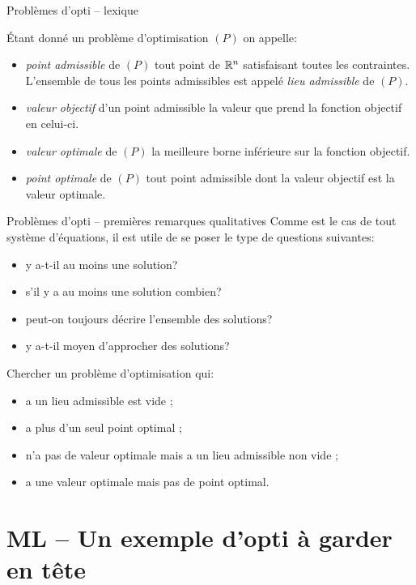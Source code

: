 \documentclass[aspectratio = 169]{beamer}
\begin{document}
\begin{frame}{Problèmes d'opti -- lexique}

  Étant donné un problème d'optimisation $(P)$ on appelle:
  \begin{itemize}
  \item<1-> \emph{point admissible} de $(P)$ tout point de $\mathbb{R}^n$
    satisfaisant toutes les contraintes. L'ensemble de tous les points
    admissibles est appelé \emph{lieu admissible} de $(P)$.
  \item<2-> \emph{valeur objectif} d'un point admissible la valeur que
    prend la fonction objectif en celui-ci.
  \item<3-> \emph{valeur optimale} de $(P)$ la meilleure borne
    inférieure sur la fonction objectif.
  \item<4-> \emph{point optimale} de $(P)$ tout point admissible dont
    la valeur objectif est la valeur optimale.
  \end{itemize}
\end{frame}

\begin{frame}{Problèmes d'opti -- premières remarques qualitatives}
  Comme est le cas de tout système d'équations, il est utile de se
  poser le type de questions suivantes:
  \begin{itemize}
  \item<2-> y a-t-il au moins une solution?
  \item<3-> s'il y a au moins une solution combien?
  \item<4-> peut-on toujours décrire l'ensemble des solutions?
  \item<5-> y a-t-il moyen d'approcher des solutions?
  \end{itemize}
  \pause[5]
  \begin{question}
    Chercher un problème d'optimisation qui:
    \begin{itemize}
    \item a un lieu admissible est vide ;
    \item a plus d'un seul point optimal ;
    \item n'a pas de valeur optimale mais a un lieu admissible non vide ;
    \item a une valeur optimale mais pas de point optimal.
    \end{itemize}
  \end{question}
\end{frame}

\section{ML -- Un exemple d'opti à garder en tête}
\end{document}
